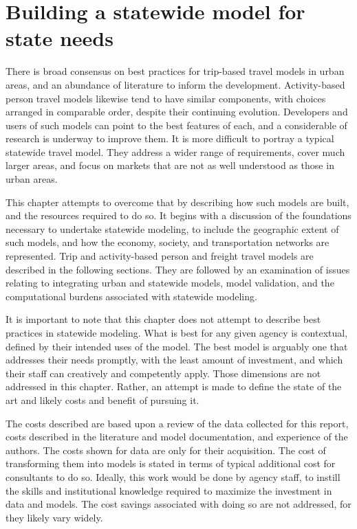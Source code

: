 \chapter{Building a statewide model for state needs}\label{sec:building-models}

There is broad consensus on best practices for trip-based travel models in urban areas, and an abundance of literature to inform the development. Activity-based person travel models likewise tend to have similar components, with choices arranged in comparable order, despite their continuing evolution. Developers and users of such models can point to the best features of each, and a considerable of research is underway to improve them. It is more difficult to portray a typical statewide travel model. They address a wider range of requirements, cover much larger areas, and focus on markets that are not as well understood as those in urban areas.

This chapter attempts to overcome that by describing how such models are built, and the resources required to do so. It begins with a discussion of the foundations necessary to undertake statewide modeling, to include the geographic extent of such models, and how the economy, society, and transportation networks are represented. Trip and activity-based person and freight travel models are described in the following sections. They are followed by an examination of issues relating to integrating urban and statewide models, model validation, and the computational burdens associated with statewide modeling.

It is important to note that this chapter does not attempt to describe best practices in statewide modeling. What is best for any given agency is contextual, defined by their intended uses of the model. The best model is arguably one that addresses their needs promptly, with the least amount of investment, and which their staff can creatively and competently apply. Those dimensions are not addressed in this chapter. Rather, an attempt is made to define the state of the art and likely costs and benefit of pursuing it.

The costs described are based upon a review of the data collected for this report, costs described in the literature and model documentation, and experience of the authors. The costs shown for data are only for their acquisition. The cost of transforming them into models is stated in terms of typical additional cost for consultants to do so. Ideally, this work would be done by agency staff, to instill the skills and institutional knowledge required to maximize the investment in data and models. The cost savings associated with doing so are not addressed, for they likely vary widely.

